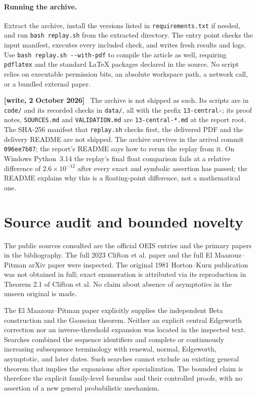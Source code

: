 \documentclass[11pt]{article}
\numberwithin{equation}{section}
\theoremstyle{remark}\newtheorem{remark}[theorem]{Remark}
\newcommand{\file}[1]{\nolinkurl{#1}}
\newenvironment{writenote}{\par\smallskip\begingroup\small\noindent\textbf{[write, 2 October 2026]}\ }{\par\endgroup\smallskip}
\begin{document}
\paragraph{Running the archive.}
Extract the archive, install the versions listed in
\texttt{requirements.txt} if needed, and run \texttt{bash replay.sh}
from the extracted directory.  The entry point checks the input manifest,
executes every included check, and writes fresh results and logs.
Use \texttt{bash replay.sh -{}-with-pdf} to compile the article as well,
requiring \texttt{pdflatex} and the standard \LaTeX{} packages declared
in the source.  No script relies on executable permission bits, an
absolute workspace path, a network call, or a bundled external paper.

\begin{writenote}
The archive is not shipped as such. Its scripts are in \file{code/} and its recorded checks in \file{data/}, all with the prefix \file{13-central-}; its proof notes, \file{SOURCES.md} and \file{VALIDATION.md} are \file{13-central-*.md} at the report root. The SHA-256 manifest that \file{replay.sh} checks first, the delivered PDF and the delivery README are not shipped. The archive survives in the arrival commit \texttt{096ee7b87}; the report's README says how to rerun the replay from it. On Windows Python~3.14 the replay's final float comparison fails at a relative difference of $2.6\times10^{-12}$ after every exact and symbolic assertion has passed; the README explains why this is a floating-point difference, not a mathematical one.
\end{writenote}

\section{Source audit and bounded novelty}\label{brs:sec:provenance}

The public sources consulted are the official OEIS entries and the
primary papers in the bibliography.  The full 2023 Clifton et al. paper
and the full El Maazouz--Pitman arXiv paper were inspected.  The original
1981 Horton--Kurn publication was not obtained in full; exact enumeration
is attributed via its reproduction in Theorem 2.1 of Clifton et al.
No claim about absence of asymptotics in the unseen original is made.

The El Maazouz--Pitman paper explicitly supplies the independent Beta
construction and the Gaussian theorem.  Neither an explicit central
Edgeworth correction nor an inverse-threshold expansion was located in
the inspected text.  Searches combined the sequence identifiers and
complete or continuously increasing subsequence terminology with
renewal, normal, Edgeworth, asymptotic, and later dates.  Such searches
cannot exclude an existing general theorem that implies the expansions
after specialization.  The bounded claim is therefore the explicit
family-level formulas and their controlled proofs, with no assertion
of a new general probabilistic mechanism.
\end{document}
